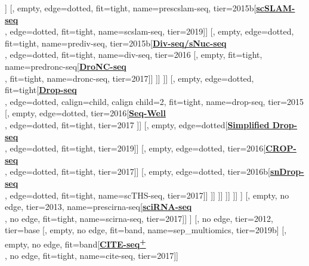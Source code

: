 \documentclass[12pt, a4]{article}
\begin{document}
\begin{center}
\begin{forest}
						[, empty, edge=dotted, tier=2015b[\href{https://www.nature.com/articles/nbt.4259}{\textbf{ScISOr-seq}}\\\citealt{gupta2018}, edge=dotted, fit=tight, tier=2018]]
						[, empty, edge=dotted, fit=tight, name=prescslam-seq, tier=2015b[\href{https://www.nature.com/articles/s41586-019-1369-y}{\textbf{scSLAM-seq}}\\\citealt{erhard2019}, edge=dotted, fit=tight, name=scslam-seq, tier=2019]]
						[, empty, edge=dotted, fit=tight, name=prediv-seq, tier=2015b[\href{https://science.sciencemag.org/content/353/6302/925.long}{\textbf{Div-seq/sNuc-seq}}\\\citealt{habib2016}, edge=dotted, fit=tight, name=div-seq, tier=2016
							[, empty, fit=tight, name=predronc-seq[\href{https://www.nature.com/articles/nmeth.4407}{\textbf{DroNC-seq}}\\\citealt{habib2017}, fit=tight, name=dronc-seq, tier=2017]]
						]]
				]]
				[, empty, edge=dotted, fit=tight[\href{https://www.cell.com/abstract/S0092-8674(15)00549-8}{\textbf{Drop-seq}}\\\citealt{macosko2015}, edge=dotted, calign=child, calign child=2, fit=tight, name=drop-seq, tier=2015
					[, empty, edge=dotted, tier=2016[\href{https://www.nature.com/articles/nmeth.4179}{\textbf{Seq-Well}}\\\citealt{gierahn2017}, edge=dotted, fit=tight, tier=2017
					]]
					[, empty, edge=dotted[\href{https://pubs.rsc.org/en/content/articlelanding/2019/lc/c9lc00014c}{\textbf{Simplified Drop-seq}}\\\citealt{biocanin2019}, edge=dotted, fit=tight, tier=2019]]
					[, empty, edge=dotted, tier=2016[\href{https://www.nature.com/articles/nmeth.4177}{\textbf{CROP-seq}}\\\citealt{datlinger2017}, edge=dotted, fit=tight, tier=2017]]
					[, empty, edge=dotted, tier=2016b[\href{https://www.nature.com/articles/nbt.4038}{\textbf{snDrop-seq}}\\\citealt{lake2017}, edge=dotted, fit=tight, name=scTHS-seq, tier=2017]]
				]]
			]]
		]]
	]]
	]
	[, empty, no edge, tier=2013, name=prescirna-seq[\href{https://science.sciencemag.org/content/357/6352/661}{\textbf{sciRNA-seq}}\\\citealt{cao2017}, no edge, fit=tight, name=scirna-seq, tier=2017]]
]
[, no edge, tier=2012, tier=base
	[, empty, no edge, fit=band, name=sep_multiomics, tier=2019b]
	[, empty, no edge, fit=band[\href{https://www.nature.com/articles/nmeth.4380}{\textbf{CITE-seq\textsuperscript{\textbf{\large{+}}}}}\\\citealt{stoeckius2017}, no edge, fit=tight, name=cite-seq, tier=2017]]

\end{forest}
\end{center}
\end{document}
